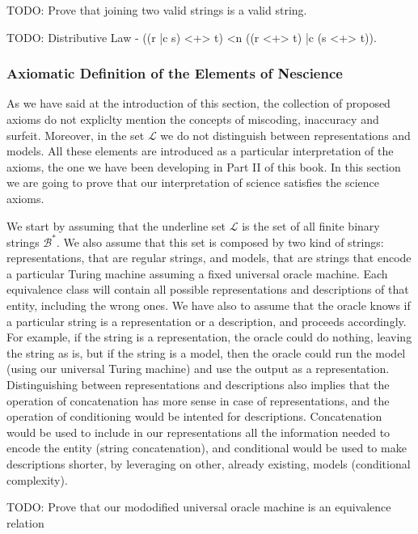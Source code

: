 {\color{red} TODO: Prove that joining two valid strings is a valid string.}

{\color{red} TODO: Distributive Law - ((r |c s) <+> t) <n ((r <+> t) |c (s <+> t)).}


\subsubsection*{Axiomatic Definition of the Elements of Nescience}

As we have said at the introduction of this section, the collection of proposed axioms do not expliclty mention the concepts of miscoding, inaccuracy and surfeit. Moreover, in the set $\mathcal{L}$ we do not distinguish between representations and models. All these elements are introduced as a particular interpretation of the axioms, the one we have been developing in Part II of this book. In this section we are going to prove that our interpretation of science satisfies the science axioms.

We start by assuming that the underline set $\mathcal{L}$ is the set of all finite binary strings $\mathcal{B}^\ast$. We also assume that this set is composed by two kind of strings: representations, that are regular strings, and models, that are strings that encode a particular Turing machine assuming a fixed universal oracle machine. Each equivalence class will contain all possible representations and descriptions of that entity, including the wrong ones. We have also to assume that the oracle knows if a particular string is a representation or a description, and proceeds accordingly. For example, if the string is a representation, the oracle could do nothing, leaving the string as is, but if the string is a model, then the oracle could run the model (using our universal Turing machine) and use the output as a representation. Distinguishing between representations and descriptions also implies that the operation of concatenation has more sense in case of representations, and the operation of conditioning would be intented for descriptions. Concatenation would be used to include in our representations all the information needed to encode the entity  (string concatenation), and conditional would be used to make descriptions shorter, by leveraging on other, already existing, models (conditional complexity).

{\color{red} TODO: Prove that our mododified universal oracle machine is an equivalence relation}

